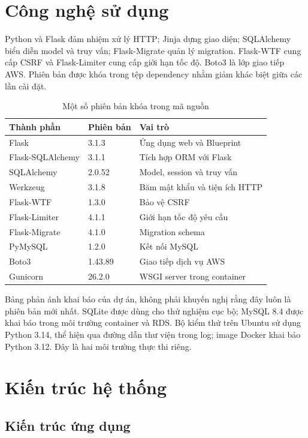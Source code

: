 \section{Công nghệ sử dụng}
Python và Flask đảm nhiệm xử lý HTTP; Jinja dựng giao diện; SQLAlchemy biểu diễn model và truy vấn; Flask-Migrate quản lý migration. Flask-WTF cung cấp CSRF và Flask-Limiter cung cấp giới hạn tốc độ. Boto3 là lớp giao tiếp AWS. Phiên bản được khóa trong tệp dependency nhằm giảm khác biệt giữa các lần cài đặt.
\begin{table}[htbp]\centering\small
\caption{Một số phiên bản khóa trong mã nguồn}
\begin{tabularx}{\textwidth}{P{3.5cm}P{2.5cm}X}\toprule
\textbf{Thành phần}&\textbf{Phiên bản}&\textbf{Vai trò}\\\midrule
Flask & 3.1.3 & Ứng dụng web và Blueprint\\
Flask-SQLAlchemy & 3.1.1 & Tích hợp ORM với Flask\\
SQLAlchemy & 2.0.52 & Model, session và truy vấn\\
Werkzeug & 3.1.8 & Băm mật khẩu và tiện ích HTTP\\
Flask-WTF & 1.3.0 & Bảo vệ CSRF\\
Flask-Limiter & 4.1.1 & Giới hạn tốc độ yêu cầu\\
Flask-Migrate & 4.1.0 & Migration schema\\
PyMySQL & 1.2.0 & Kết nối MySQL\\
Boto3 & 1.43.89 & Giao tiếp dịch vụ AWS\\
Gunicorn & 26.2.0 & WSGI server trong container\\\bottomrule
\end{tabularx}\end{table}
Bảng phản ánh khai báo của dự án, không phải khuyến nghị rằng đây luôn là phiên bản mới nhất. SQLite được dùng cho thử nghiệm cục bộ; MySQL 8.4 được khai báo trong môi trường container và RDS. Bộ kiểm thử trên Ubuntu sử dụng Python 3.14, thể hiện qua đường dẫn thư viện trong log; image Docker khai báo Python 3.12. Đây là hai môi trường thực thi riêng.

\section{Kiến trúc hệ thống}
\subsection{Kiến trúc ứng dụng}

